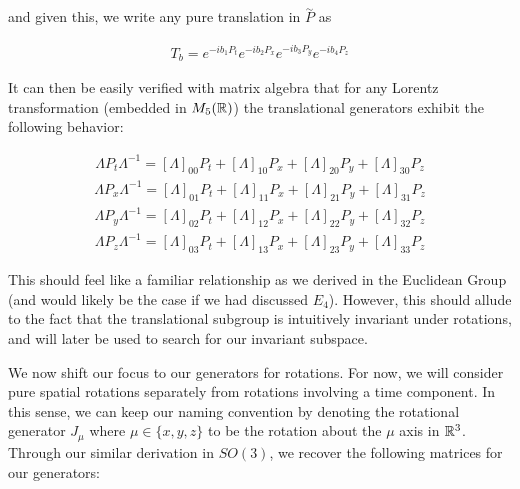 and given this, we write any pure translation in $\overset{\sim}{P}$ as 

\begin{equation}
\begin{aligned}
	T_b = e^{-ib_1P_t}e^{-ib_2P_x}e^{-ib_3P_y}e^{-ib_4P_z}
\end{aligned}
\end{equation}

It can then be easily verified with matrix algebra that for any Lorentz transformation (embedded in $M_5(\mathbb{R})$) the translational generators exhibit the following behavior:

\begin{equation}
\begin{aligned}
	\Lambda P_t \Lambda^{-1} = [\Lambda]_{00}P_t + [\Lambda]_{10}P_x + [\Lambda]_{20}P_y + [\Lambda]_{30}P_z
\end{aligned}
\end{equation}
\begin{equation}
\begin{aligned}
	\Lambda P_x \Lambda^{-1} = [\Lambda]_{01}P_t + [\Lambda]_{11}P_x + [\Lambda]_{21}P_y + [\Lambda]_{31}P_z
\end{aligned}
\end{equation}
\begin{equation}
\begin{aligned}
	\Lambda P_y \Lambda^{-1} = [\Lambda]_{02}P_t + [\Lambda]_{12}P_x + [\Lambda]_{22}P_y + [\Lambda]_{32}P_z
\end{aligned}
\end{equation}
\begin{equation}
\begin{aligned}
	\Lambda P_z \Lambda^{-1} = [\Lambda]_{03}P_t + [\Lambda]_{13}P_x + [\Lambda]_{23}P_y + [\Lambda]_{33}P_z
\end{aligned}
\end{equation}

This should feel like a familiar relationship as we derived in the Euclidean Group (and would likely be the case if we had discussed $E_4$). However, this should allude to the fact that the translational subgroup is intuitively invariant under rotations, and will later be used to search for our invariant subspace. 

We now shift our focus to our generators for rotations. For now, we will consider pure spatial rotations separately from rotations involving a time component. In this sense, we can keep our naming convention by denoting the rotational generator $J_\mu$ where $\mu\in\{x,y,z\}$ to be the rotation about the $\mu$ axis in $\mathbb{R}^3$. Through our similar derivation in $SO(3)$, we recover the following matrices for our generators:


